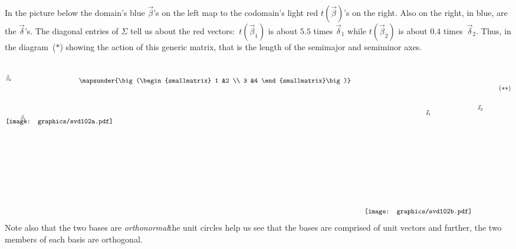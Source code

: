 In the picture below the domain's 
blue $\vec{\beta}$'s on the left map to the codomain's light red 
$t(\vec{\beta})$'s on the right.
Also on the right, in blue, are the $\vec{\delta}$'s.
The diagonal entries of $\Sigma$ tell us about the
red vectors:~$t(\vec{\beta}_1)$ is about $5.5$ times $\vec{\delta}_1$
while $t(\vec{\beta}_2)$ is about $0.4$ times~$\vec{\delta}_2$.
Thus, in the diagram~($*$) showing the action of this generic matrix,
that is the length of the semimajor and semiminor axes. 
\begin{equation*}
  \setlength{\unitlength}{1in}
  \begin{picture}(1.35,1.35)
    \put(0,1.825){\texttt{[image: graphics/svd102a.pdf]}}
    \put(.3,1.9){\scriptsize $\vec{\beta}_1$}
    \put(0,2.7){\scriptsize $\vec{\beta}_2$}
  \end{picture}
  \quad
  \raisebox{2.65in}{$\mapsunder{\big (\begin{smallmatrix} 1 &2 \\ 3 &4 \end{smallmatrix}\big )}$}
  \qquad
  \begin{picture}(2.45,3.15)
    \put(0,0){\texttt{[image: graphics/svd102b.pdf]}}
    \put(1.25,2){\scriptsize $\vec{\delta}_1$}
    \put(2.3,2.1){\scriptsize $\vec{\delta}_2$}
  \end{picture}
  \tag*{\raisebox{2.5in}{($**$)}}
\end{equation*}
Note also that the two bases are \textit{orthonormal}\Dash the unit circles help
us see that the bases are comprised of unit vectors and further,
the two members of each basis are orthogonal.


